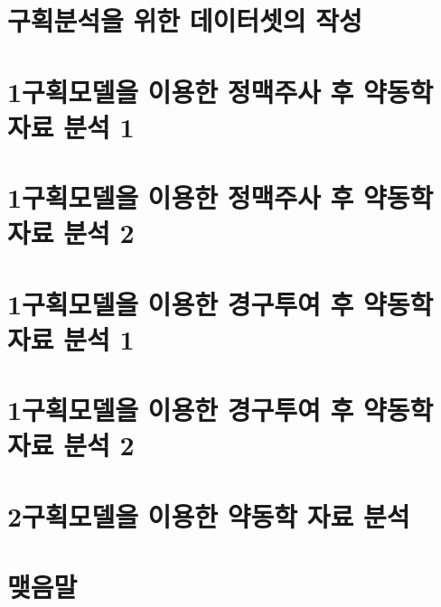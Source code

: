 \documentclass[
  11pt,
  krantz2, a4paper, twoside]{krantz}
\begin{document}
\hypertarget{uxad6cuxd68duxbd84uxc11duxc744-uxc704uxd55c-uxb370uxc774uxd130uxc14buxc758-uxc791uxc131}{%
\section{구획분석을 위한 데이터셋의 작성}\label{uxad6cuxd68duxbd84uxc11duxc744-uxc704uxd55c-uxb370uxc774uxd130uxc14buxc758-uxc791uxc131}}

\hypertarget{uxad6cuxd68duxbaa8uxb378uxc744-uxc774uxc6a9uxd55c-uxc815uxb9e5uxc8fcuxc0ac-uxd6c4-uxc57duxb3d9uxd559-uxc790uxb8cc-uxbd84uxc11d-1}{%
\section{1구획모델을 이용한 정맥주사 후 약동학 자료 분석 1}\label{uxad6cuxd68duxbaa8uxb378uxc744-uxc774uxc6a9uxd55c-uxc815uxb9e5uxc8fcuxc0ac-uxd6c4-uxc57duxb3d9uxd559-uxc790uxb8cc-uxbd84uxc11d-1}}

\hypertarget{uxad6cuxd68duxbaa8uxb378uxc744-uxc774uxc6a9uxd55c-uxc815uxb9e5uxc8fcuxc0ac-uxd6c4-uxc57duxb3d9uxd559-uxc790uxb8cc-uxbd84uxc11d-2}{%
\section{1구획모델을 이용한 정맥주사 후 약동학 자료 분석 2}\label{uxad6cuxd68duxbaa8uxb378uxc744-uxc774uxc6a9uxd55c-uxc815uxb9e5uxc8fcuxc0ac-uxd6c4-uxc57duxb3d9uxd559-uxc790uxb8cc-uxbd84uxc11d-2}}

\hypertarget{uxad6cuxd68duxbaa8uxb378uxc744-uxc774uxc6a9uxd55c-uxacbduxad6cuxd22cuxc5ec-uxd6c4-uxc57duxb3d9uxd559-uxc790uxb8cc-uxbd84uxc11d-1}{%
\section{1구획모델을 이용한 경구투여 후 약동학 자료 분석 1}\label{uxad6cuxd68duxbaa8uxb378uxc744-uxc774uxc6a9uxd55c-uxacbduxad6cuxd22cuxc5ec-uxd6c4-uxc57duxb3d9uxd559-uxc790uxb8cc-uxbd84uxc11d-1}}

\hypertarget{uxad6cuxd68duxbaa8uxb378uxc744-uxc774uxc6a9uxd55c-uxacbduxad6cuxd22cuxc5ec-uxd6c4-uxc57duxb3d9uxd559-uxc790uxb8cc-uxbd84uxc11d-2}{%
\section{1구획모델을 이용한 경구투여 후 약동학 자료 분석 2}\label{uxad6cuxd68duxbaa8uxb378uxc744-uxc774uxc6a9uxd55c-uxacbduxad6cuxd22cuxc5ec-uxd6c4-uxc57duxb3d9uxd559-uxc790uxb8cc-uxbd84uxc11d-2}}

\hypertarget{uxad6cuxd68duxbaa8uxb378uxc744-uxc774uxc6a9uxd55c-uxc57duxb3d9uxd559-uxc790uxb8cc-uxbd84uxc11d}{%
\section{2구획모델을 이용한 약동학 자료 분석}\label{uxad6cuxd68duxbaa8uxb378uxc744-uxc774uxc6a9uxd55c-uxc57duxb3d9uxd559-uxc790uxb8cc-uxbd84uxc11d}}

\hypertarget{uxb9fauxc74cuxb9d0-2}{%
\section{맺음말}\label{uxb9fauxc74cuxb9d0-2}}

\printindex
\end{document}
